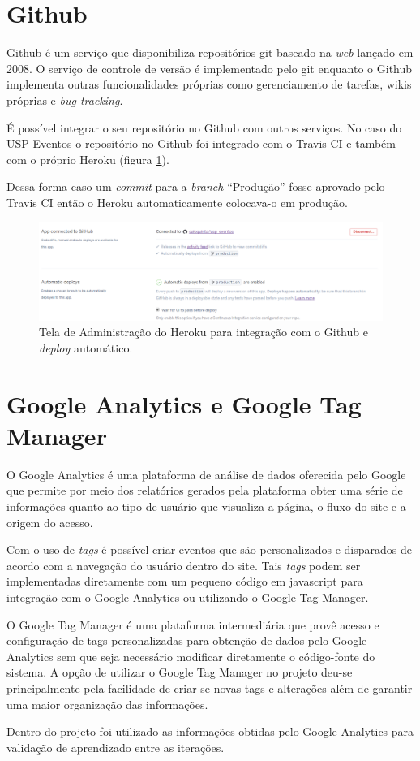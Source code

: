 \section{Github}
\par Github é um serviço que disponibiliza repositórios git baseado na \emph{web} lançado em 2008. O serviço de controle de versão é implementado pelo git enquanto o Github implementa outras funcionalidades próprias como gerenciamento de tarefas, wikis próprias e \emph{bug tracking}.
\par É possível integrar o seu repositório no Github com outros serviços. No caso do USP Eventos o repositório no Github foi integrado com o Travis CI e também com o próprio Heroku (figura \ref{fig:heroku_automatic_deploy}).
\par Dessa forma caso um \emph{commit} para a \emph{branch} ``Produção'' fosse aprovado pelo Travis CI então o Heroku automaticamente colocava-o em produção.
\begin{figure}[htb]
\centering
\includegraphics[width=15cm]{figuras/heroku_automatic_deploy}
\caption{\label{fig:heroku_automatic_deploy} Tela de Administração do Heroku para integração com o Github e \emph{deploy} automático.}
\end{figure}
\section{Google Analytics e Google Tag Manager}
\par O Google Analytics é uma plataforma de análise de dados oferecida pelo Google que permite por meio dos relatórios gerados pela plataforma obter uma série de informações quanto ao tipo de usuário que visualiza a página, o fluxo do site e a origem do acesso.
\par Com o uso de \emph{tags} é possível criar eventos que são personalizados e disparados de acordo com a navegação do usuário dentro do site. Tais \emph{tags} podem ser implementadas diretamente com um pequeno código em javascript para integração com o Google Analytics ou utilizando o Google Tag Manager.
\par O Google Tag Manager é uma plataforma intermediária que provê acesso e configuração de tags personalizadas para obtenção de dados pelo Google Analytics sem que seja necessário modificar diretamente o código-fonte do sistema. A opção de utilizar o Google Tag Manager no projeto deu-se principalmente pela facilidade de criar-se novas tags e alterações além de garantir uma maior organização das informações.
\par Dentro do projeto foi utilizado as informações obtidas pelo Google Analytics para validação de aprendizado entre as iterações.

